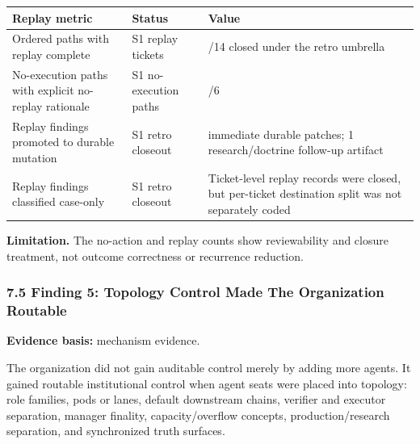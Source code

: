 \documentclass[
]{article}
\newcounter{none} %
\begin{document}
{\def\LTcaptype{none} %
\begin{longtable}[]{@{}
  >{\raggedright\arraybackslash}p{}
  >{\raggedright\arraybackslash}p{}
  >{\raggedright\arraybackslash}p{}@{}}
\toprule\noalign{}
\begin{minipage}[b]{\linewidth}\raggedright
Replay metric
\end{minipage} & \begin{minipage}[b]{\linewidth}\raggedright
Status
\end{minipage} & \begin{minipage}[b]{\linewidth}\raggedright
Value
\end{minipage} \\
\midrule\noalign{}
\endhead
\bottomrule\noalign{}
\endlastfoot
Ordered paths with replay complete & S1 replay tickets & 14/14 closed under the retro umbrella \\
No-execution paths with explicit no-replay rationale & S1 no-execution paths & 6/6 \\
Replay findings promoted to durable mutation & S1 retro closeout & 0 immediate durable patches; 1 research/doctrine follow-up artifact \\
Replay findings classified case-only & S1 retro closeout & Ticket-level replay records were closed, but per-ticket destination split was not separately coded \\
\end{longtable}
}

\textbf{Limitation.} The no-action and replay counts show reviewability and closure treatment, not outcome correctness or recurrence reduction.

\subsubsection{7.5 Finding 5: Topology Control Made The Organization Routable}\label{finding-5-topology-control-made-the-organization-routable}

\textbf{Evidence basis:} mechanism evidence.

The organization did not gain auditable control merely by adding more agents. It gained routable institutional control when agent seats were placed into topology: role families, pods or lanes, default downstream chains, verifier and executor separation, manager finality, capacity/overflow concepts, production/research separation, and synchronized truth surfaces.
\end{document}
